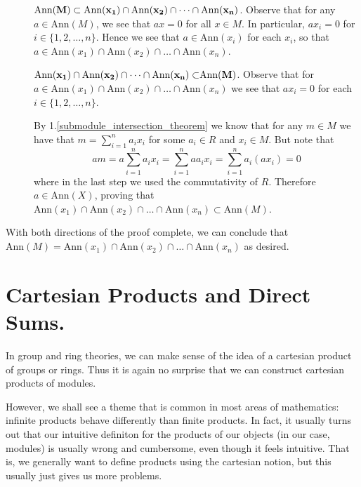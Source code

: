 \documentclass[12pt,letterpaper]{algebra_book}
\newcommand{\ann}{\mbox{Ann}}
\theoremstyle{definition}
\begin{document}
\begin{prf}
    \begin{description}
        \item[\phantom{m}]$\bf{\ann(M) \subset \ann(x_1) \cap \ann(x_2) \cap \dots \cap \ann(x_n)}$.
        Observe that for any $a \in \ann(M)$, we see that $ax = 0$
        for all $x \in M$. In particular, $ax_i = 0$ for $i \in
        \{1, 2, \dots, n\}$. Hence we see that $a \in \ann(x_i)$
        for each $x_i$, so that $a \in \ann(x_1) \cap \ann(x_2)
        \cap \dots \cap \ann(x_n)$.
        
        \item[\phantom{m}]$\bf{\ann(x_1) \cap \ann(x_2) \cap \dots
        \cap \ann(x_n) \subset }\bf{\ann(M)}$. Observe that for $
        a \in \ann(x_1) \cap \ann(x_2) \cap \dots \cap \ann(x_n)$
        we see that $ax_i = 0$ for each $i \in \{1, 2, \dots,
        n\}$.
            
        By 1.\ref{submodule_intersection_theorem} we know that for
        any $m \in M$ we have that $\displaystyle m = \sum_{i =
        1}^{n}a_ix_i$ for some $a_i \in R$ and $x_i \in M$. But
        note that 
        \[
            am = a\sum_{i =1}^{n}a_ix_i = \sum_{i =1}^{n}aa_ix_i = \sum_{i =1}^{n}a_i(ax_i) =0
        \]
        where in the last step we used the commutativity of $R$.
        Therefore $a \in \ann(X)$, proving that $\ann(x_1) \cap \ann(x_2) \cap \dots
        \cap \ann(x_n) \subset \ann(M)$.
    \end{description}
    With both directions of the proof complete, we can conclude
    that 
    $\ann(M) = \ann(x_1) \cap \ann(x_2) \cap \dots \cap
    \ann(x_n)$ as desired.
\end{prf}

\newpage
\section{Cartesian Products and Direct Sums. }

In group and ring theories, we can make sense of the idea of a
cartesian product of groups or rings. Thus it is again no surprise
that we can construct cartesian products of modules. 

However, we shall see a theme that is common in most areas of
mathematics: infinite products behave differently than finite
products. In fact, it usually turns out that our intuitive
definiton for the products of our objects (in our case, modules)
is usually wrong and cumbersome, even though it feels intuitive. 
That is, we generally want to define products using the cartesian
notion, but this usually just gives us more problems. 
\end{document}
